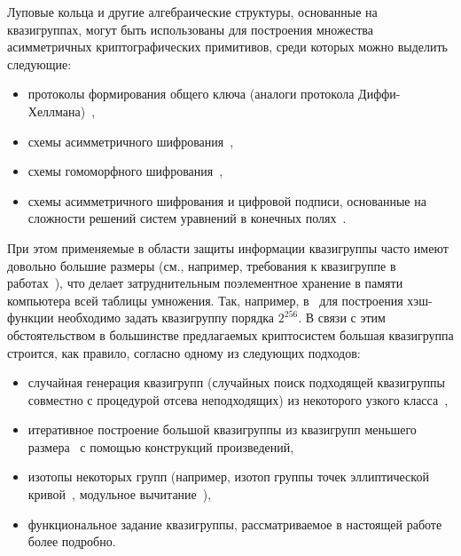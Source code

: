     Луповые кольца и другие алгебраические структуры, основанные на квазигруппах, могут быть использованы для построения множества асимметричных криптографических примитивов, среди которых можно выделить следующие:
    \begin{itemize}
        \item протоколы формирования общего ключа (аналоги протокола Диффи-Хеллмана)~\autocite{DH14, DH16, baryshnikov2017key, quantum18},
        \item схемы асимметричного шифрования~\autocite{markov12, pke10, gribovphd},
        \item схемы гомоморфного шифрования~\autocite{gribovphd, homomo15, katyshev2020application, markov20},
        \item схемы асимметричного шифрования и цифровой подписи, основанные на сложности решений систем уравнений в конечных полях~\autocite{gligoroski2008public, gligoroski2008multivariate, chen2010multivariate, gligoroski2011mqq}.
    \end{itemize}

    При этом применяемые в области защиты информации квазигруппы часто имеют довольно большие размеры (см., например, требования к квазигруппе в работах~\autocite{EdonR, EdonRprime, chen2010multivariate}), что делает затруднительным поэлементное хранение в памяти компьютера всей таблицы умножения. 
    Так, например, в~\autocite{EdonRprime} для построения хэш-функции необходимо задать квазигруппу порядка $2^{256}$. 
    В связи с этим обстоятельством в большинстве предлагаемых криптосистем большая квазигруппа строится, как правило, согласно одному из следующих подходов:
    \begin{itemize}
        \item случайная генерация квазигрупп (случайных поиск подходящей квазигруппы совместно с процедурой отсева неподходящих) из некоторого узкого класса~\autocite{gligoroski2008public, chen2010multivariate},
        \item итеративное построение большой квазигруппы из квазигрупп меньшего размера~\autocite{EdonRprime, gribovphd} с помощью конструкций произведений,
        \item изотопы некоторых  групп (например, изотоп группы точек эллиптической кривой~\autocite{DH16}, модульное вычитание~\autocite{snavsel2009hash}),
        \item функциональное задание квазигруппы, рассматриваемое в настоящей работе более подробно.
    \end{itemize}

